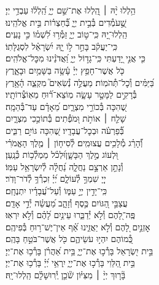 \documentclass[twoside, openany, parskip=half, 11pt]{book}
\begin{document}
\begin{narrow}
הַ֥לְלוּ יָ֨הּ ׀ \hfill \break
הַֽ֭לְלוּ אֶת־שֵׁ֣ם יְיָ֑ \hfill הַֽ֝לְל֗וּ עַבְדֵ֥י יְיָ׃ \\
שֶׁ֣֭עֹמְ֯דִים בְּ֯בֵ֣ית יְיָ֑ \hfill בְּ֯֝חַצְר֗וֹת בֵּ֣ית אֱלֹהֵֽינוּ׃ \\
הַֽלְלוּ־יָ֭הּ כִּֽי־ט֣וֹב יְיָ֑ \hfill זַמְּ֯ר֥וּ לִ֝שְׁמ֗וֹ כִּ֣י נָעִֽים׃ \\
כִּֽי־יַעֲקֹ֗ב בָּחַ֣ר ל֣וֹ יָ֑הּ \hfill יִ֝שְׂרָאֵ֗ל לִסְגֻלָּתֽוֹ׃ \\
כִּ֤י אֲנִ֣י יָ֭דַעְתִּי כִּֽי־גָד֣וֹל יְיָ֑ \hfill וַ֝אֲדֹנֵ֗ינוּ מִכׇּל־אֱלֹהִֽים׃ \\
כֹּ֤ל אֲשֶׁר־חָפֵ֥ץ יְיָ֗ עָ֫שָׂ֥ה \hfill בַּשָּׁמַ֥יִם וּבָאָ֑רֶץ\\ בַּ֝יַּמִּ֗ים וְ֯כׇל־תְּ֯הֹמֽוֹת׃ \hfill
מַעֲלֶ֣ה נְ֯שִׂאִים֮ מִקְצֵ֢ה הָ֫אָ֥רֶץ\\ בְּ֯רָקִ֣ים לַמָּטָ֣ר עָשָׂ֑ה \hfill מֽוֹצֵא־ר֗֝וּחַ מֵאֽוֹצְ֯רוֹתָֽיו׃ \\
שֶׁ֭הִכָּה בְּ֯כוֹרֵ֣י מִצְרָ֑יִם \hfill מֵ֝אָדָ֗ם עַד־בְּ֯הֵמָֽה׃ \\
שָׁלַ֤ח ׀ אוֹתֹ֣ת וּ֭מֹפְ֯תִים \hfill בְּ֯תוֹכֵ֣כִי מִצְרָ֑יִם\\ בְּ֯֝פַרְעֹ֗ה וּבְכׇל־עֲבָדָֽיו׃ \hfill
שֶׁ֭הִכָּה גּוֹיִ֣ם רַבִּ֑ים\\ וְ֯֝הָרַ֗ג מְ֯לָכִ֥ים עֲצוּמִֽים׃ \hfill
לְ֯סִיח֤וֹן ׀ מֶ֤לֶךְ הָאֱמֹרִ֗י\\ וּ֭לְעוֹג מֶ֣לֶךְ הַבָּשָׁ֑ן\hfill וּ֝לְכֹ֗ל מַמְלְ֯כ֥וֹת כְּ֯נָֽעַן׃ \\
וְ֯נָתַ֣ן אַרְצָ֣ם נַחֲלָ֑ה \hfill נַ֝חֲלָ֗ה לְ֯יִשְׂרָאֵ֥ל עַמּֽוֹ׃ \\
יְיָ֭ שִׁמְךָ֣ לְ֯עוֹלָ֑ם \hfill יְ֝יָ֗ זִכְרְ֯ךָ֥ לְ֯דֹר־וָדֹֽר׃ \\
כִּֽי־יָדִ֣ין יְיָ֣ עַמּ֑וֹ \hfill וְ֯עַל־עֲ֝בָדָ֗יו יִתְנֶחָֽם׃ \\
עֲצַבֵּ֣י הַ֭גּוֹיִם כֶּ֣סֶף וְ֯זָהָ֑ב \hfill מַ֝עֲשֵׂ֗ה יְ֯דֵ֣י אָדָֽם׃ \\
פֶּֽה־לָ֭הֶם וְ֯לֹ֣א יְ֯דַבֵּ֑רוּ \hfill עֵינַ֥יִם לָ֝הֶ֗ם וְ֯לֹ֣א יִרְאֽוּ׃ \\
אׇזְנַ֣יִם לָ֭הֶם וְ֯לֹ֣א יַאֲזִ֑ינוּ \hfill אַ֗֝ף אֵין־יֶשׁ־ר֥וּחַ בְּ֯פִיהֶֽם׃ \\
כְּ֭֯מוֹהֶם יִהְי֣וּ עֹשֵׂיהֶ֑ם \hfill כֹּ֖ל אֲשֶׁר־בֹּטֵ֣חַ בָּהֶֽם׃ \\
בֵּ֣ית יִ֭שְׂרָאֵל בָּרְ֯כ֣וּ אֶת־יְיָ֑ \hfill בֵּ֥ית אַ֝הֲרֹ֗ן בָּרְ֯כ֥וּ אֶת־יְיָ׃ \\
בֵּ֣ית הַ֭לֵּוִי בָּרְ֯כ֣וּ אֶת־יְיָ֑ \hfill יִֽרְאֵ֥י יְ֝יָ֗ בָּרְ֯כ֥וּ אֶת־יְיָ׃ \\
בָּ֘ר֤וּךְ יְיָ֨ ׀ מִצִּיּ֗וֹן שֹׁ֘כֵ֤ן יְֽ֯רוּשָׁלָ֗‍ִם \hfill הַֽלְלוּ־יָֽהּ׃ \\



\end{narrow}
\end{document}
